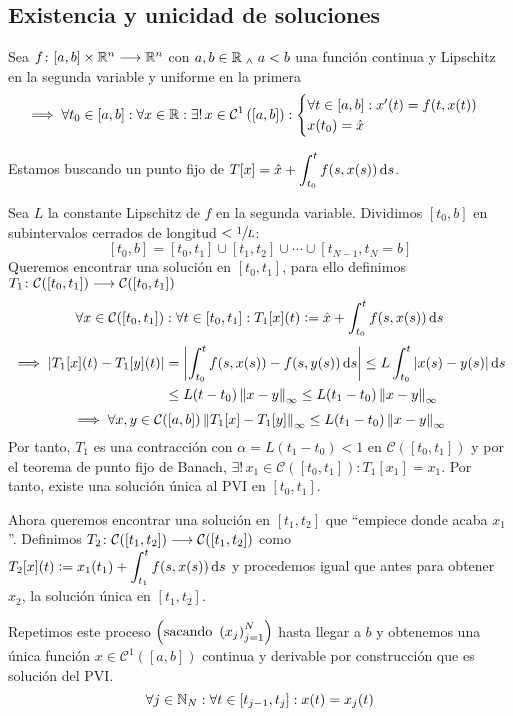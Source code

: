\subsection{Existencia y unicidad de soluciones}
\begin{teo}
	Sea $f \colon [a,b]\times \mathbb{R}^n \longrightarrow \mathbb{R}^n$ con $a, b \in \mathbb{R} \; _{\wedge} \; a < b$ una función continua y Lipschitz en la segunda variable y uniforme en la primera
	\[\implies \forall t_0\in [a,b] : \forall x \in \mathbb{R} : \exists! \, x \in \mathcal{C}^1\left([a,b]\right) : \begin{cases}
			\forall t \in [a,b] : x'(t)=f(t, x(t)) \\
			x(t_0) = \hat{x}
		\end{cases}\]
	\begin{dem}
		Estamos buscando un punto fijo de $\ds T[x] = \hat{x} + \int_{t_0}^{t} f(s, x(s)) \odif{s}$.

		Sea $L$ la constante Lipschitz de $f$ en la segunda variable. Dividimos $[t_0, b]$ en subintervalos cerrados de longitud $< \sfrac{1}{L}$:
		\[[t_0, b] = [t_0, t_1] \cup [t_1, t_2] \cup \cdots \cup [t_{N-1}, t_N=b]\]
		Queremos encontrar una solución en $[t_0, t_1]$, para ello definimos $T_1 \colon \mathcal{C}([t_0, t_1]) \longrightarrow \mathcal{C}([t_0, t_1])$
		\[\forall x \in \mathcal{C}([t_0, t_1]) : \forall t \in [t_0, t_1] : T_1[x](t) \defeq \hat{x} + \int_{t_0}^{t} f(s, x(s)) \odif{s}\]
		\[\begin{aligned}
				\implies \abs{T_1[x](t) - T_1[y](t)} & = \abs{\int_{t_0}^{t} f(s, x(s)) - f(s, y(s)) \odif{s}} \leq L\int_{t_0}^{t} \abs{x(s)-y(s)} \odif{s} \\
				                                     & \leq L(t-t_0)\norm{x-y}_\infty \leq L(t_1-t_0)\norm{x-y}_\infty
			\end{aligned}\]
		\[\implies \forall x, y \in \mathcal{C}([a,b])  \left\Vert T_1[x]-T_1[y]\right\Vert_\infty \leq L(t_1-t_0)\left\Vert x-y\right\Vert_\infty\]
		Por tanto, $T_1$ es una contracción con $\alpha = L(t_1-t_0) < 1$ en $\mathcal{C}([t_0, t_1])$ y por el teorema de punto fijo de Banach, $\exists! \, x_1 \in \mathcal{C}([t_0, t_1]) : T_1[x_1]=x_1$. Por tanto, existe una solución única al PVI en $[t_0, t_1]$.

		Ahora queremos encontrar una solución en $[t_1, t_2]$ que ``empiece donde acaba $x_1$''. Definimos $T_2 \colon \mathcal{C}([t_1, t_2]) \longrightarrow \mathcal{C}([t_1, t_2])$ como $\ds T_2[x](t) \defeq x_1(t_1) + \int_{t_1}^{t} f(s, x(s)) \odif{s}$ y procedemos igual que antes para obtener $x_2$, la solución única en $[t_1, t_2]$.

		Repetimos este proceso $\left(\text{sacando }\left(x_j\right)_{j=1}^{N}\right)$ hasta llegar a $b$ y obtenemos una única función $x \in \mathcal{C}^1([a,b])$ continua y derivable por construcción que es solución del PVI.
		\[\forall j \in \mathbb{N}_N : \forall t \in [t_{j-1}, t_j] : x(t) = x_j(t)\]
	\end{dem}
\end{teo}

